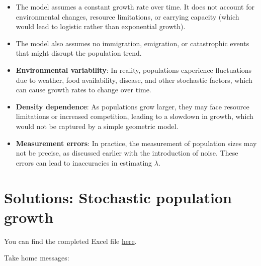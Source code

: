 \documentclass[
  a4paper]{book}
\begin{document}
\begin{itemize}
\item
  The model assumes a constant growth rate over time. It does not account for environmental changes, resource limitations, or carrying capacity (which would lead to logistic rather than exponential growth).
\item
  The model also assumes no immigration, emigration, or catastrophic events that might disrupt the population trend.
\item
  \textbf{Environmental variability}: In reality, populations experience fluctuations due to weather, food availability, disease, and other stochastic factors, which can cause growth rates to change over time.
\item
  \textbf{Density dependence}: As populations grow larger, they may face resource limitations or increased competition, leading to a slowdown in growth, which would not be captured by a simple geometric model.
\item
  \textbf{Measurement errors}: In practice, the measurement of population sizes may not be precise, as discussed earlier with the introduction of noise. These errors can lead to inaccuracies in estimating \(\lambda\).
\end{itemize}

\section{Solutions: Stochastic population growth}\label{solutions-stochastic-population-growth}

You can find the completed Excel file \href{https://www.dropbox.com/s/baao06vi0c0quns/StochasticPopulationGrowth-complete.xlsx?dl=1}{here}.

Take home messages:
\end{document}
